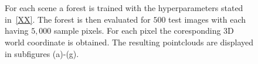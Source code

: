 \documentclass[final]{cvpr}
\begin{document}
\begin{figure}[h!]
	\begin{center}
	
	\,
	\,
	\,
	\\
	\,
	\,

	\end{center}
	\caption{For each scene a forest is trained with the hyperparameters stated in~\ref{XX}. The forest 
	is then evaluated for $500$ test images with each having $5,000$ sample pixels. For each pixel the coresponding
	3D world coordinate is obtained. The resulting pointclouds are displayed in subfigures (a)-(g). }
	\label{fig:pointclouds}
	\label{fig:onecol}
\end{figure}
\end{document}
